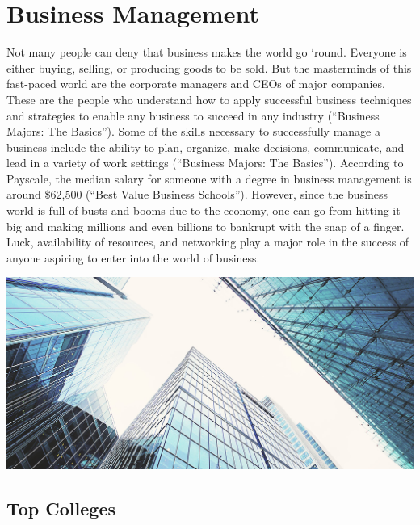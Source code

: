 \chapter{Business Management}
\begin{multicols}{2}

Not many people can deny that business makes the world go ‘round. Everyone is either buying, selling, or producing goods to be sold. But the masterminds of this fast-paced world are the corporate managers and CEOs of major companies. These are the people who understand how to apply successful business techniques and strategies to enable any business to succeed in any industry (“Business Majors: The Basics”). Some of the skills necessary to successfully manage a business include the ability to plan, organize, make decisions, communicate, and lead in a variety of work settings (“Business Majors: The Basics”). According to Payscale, the median salary for someone with a degree in business management is around \$62,500 (“Best Value Business Schools”). However, since the business world is full of busts and booms due to the economy, one can go from hitting it big and making millions and even billions to bankrupt with the snap of a finger. Luck, availability of resources, and networking play a major role in the success of anyone aspiring to enter into the world of business. 

\begin{Figure}
 \centering
 \includegraphics[width=\linewidth]{images/BusinessManagement}
 \label{fig:Tall Buildings}
\end{Figure}

\end{multicols}

\section{Top Colleges}

